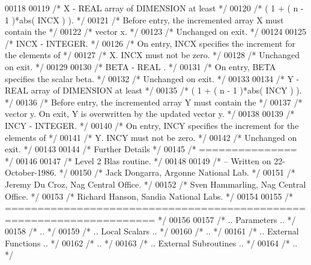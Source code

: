 \begin{DoxyCode}
00118 
00119 \textcolor{comment}{/*  X      - REAL             array of DIMENSION at least */}
00120 \textcolor{comment}{/*           ( 1 + ( n - 1 )*abs( INCX ) ). */}
00121 \textcolor{comment}{/*           Before entry, the incremented array X must contain the */}
00122 \textcolor{comment}{/*           vector x. */}
00123 \textcolor{comment}{/*           Unchanged on exit. */}
00124 
00125 \textcolor{comment}{/*  INCX   - INTEGER. */}
00126 \textcolor{comment}{/*           On entry, INCX specifies the increment for the elements of */}
00127 \textcolor{comment}{/*           X. INCX must not be zero. */}
00128 \textcolor{comment}{/*           Unchanged on exit. */}
00129 
00130 \textcolor{comment}{/*  BETA   - REAL            . */}
00131 \textcolor{comment}{/*           On entry, BETA specifies the scalar beta. */}
00132 \textcolor{comment}{/*           Unchanged on exit. */}
00133 
00134 \textcolor{comment}{/*  Y      - REAL             array of DIMENSION at least */}
00135 \textcolor{comment}{/*           ( 1 + ( n - 1 )*abs( INCY ) ). */}
00136 \textcolor{comment}{/*           Before entry, the incremented array Y must contain the */}
00137 \textcolor{comment}{/*           vector y. On exit, Y is overwritten by the updated vector y. */}
00138 
00139 \textcolor{comment}{/*  INCY   - INTEGER. */}
00140 \textcolor{comment}{/*           On entry, INCY specifies the increment for the elements of */}
00141 \textcolor{comment}{/*           Y. INCY must not be zero. */}
00142 \textcolor{comment}{/*           Unchanged on exit. */}
00143 
00144 \textcolor{comment}{/*  Further Details */}
00145 \textcolor{comment}{/*  =============== */}
00146 
00147 \textcolor{comment}{/*  Level 2 Blas routine. */}
00148 
00149 \textcolor{comment}{/*  -- Written on 22-October-1986. */}
00150 \textcolor{comment}{/*     Jack Dongarra, Argonne National Lab. */}
00151 \textcolor{comment}{/*     Jeremy Du Croz, Nag Central Office. */}
00152 \textcolor{comment}{/*     Sven Hammarling, Nag Central Office. */}
00153 \textcolor{comment}{/*     Richard Hanson, Sandia National Labs. */}
00154 
00155 \textcolor{comment}{/*  ===================================================================== */}
00156 
00157 \textcolor{comment}{/*     .. Parameters .. */}
00158 \textcolor{comment}{/*     .. */}
00159 \textcolor{comment}{/*     .. Local Scalars .. */}
00160 \textcolor{comment}{/*     .. */}
00161 \textcolor{comment}{/*     .. External Functions .. */}
00162 \textcolor{comment}{/*     .. */}
00163 \textcolor{comment}{/*     .. External Subroutines .. */}
00164 \textcolor{comment}{/*     .. */}

\end{DoxyCode}
